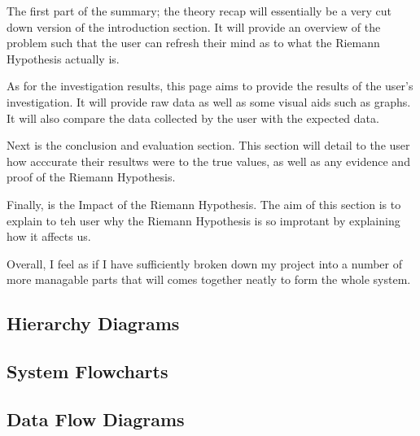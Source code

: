 \documentclass{article}
\begin{document}
The first part of the summary; the theory recap will essentially be a very cut down version of the introduction section. It will provide an overview of the problem such that the user can refresh their mind as to what the Riemann Hypothesis actually is.

As for the investigation results, this page aims to provide the results of the user's investigation. It will provide raw data as well as some visual aids such as graphs. It will also compare the data collected by the user with the expected data.

Next is the conclusion and evaluation section. This section will detail to the user how acccurate their resultws were to the true values, as well as any evidence and proof of the Riemann Hypothesis.

Finally, is the Impact of the Riemann Hypothesis. The aim of this section is to explain to teh user why the Riemann Hypothesis is so improtant by explaining how it affects us.


Overall, I feel as if I have sufficiently broken down my project into a number of more managable parts that will comes together neatly to form the whole system.
\subsection{Hierarchy Diagrams}

\subsection{System Flowcharts}

\subsection{Data Flow Diagrams}

\clearpage
\end{document}
